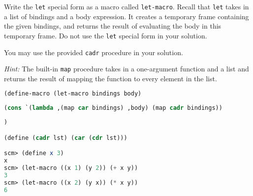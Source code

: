 \question Write the \texttt{let} special form as a macro called
\texttt{let-macro}.  Recall that \texttt{let} takes in a list of bindings and a
body expression. It creates a temporary frame containing the given bindings,
and returns the result of evaluating the body in this temporary frame. Do not
use the \texttt{let} special form in your solution.

You may use the provided \texttt{cadr} procedure in your solution.

\textit{Hint:} The built-in \texttt{map} procedure takes in a one-argument
function and a list and returns the result of mapping the function to every
element in the list.

\begin{lstlisting}[language=Scheme]
(define-macro (let-macro bindings body)
\end{lstlisting}

\begin{solution}[.5in]
\begin{lstlisting}[language=Scheme]
  (cons `(lambda ,(map car bindings) ,body) (map cadr bindings))
\end{lstlisting}
\end{solution}

\begin{lstlisting}[language=Scheme]
)

(define (cadr lst) (car (cdr lst)))

scm> (define x 3)
x
scm> (let-macro ((x 1) (y 2)) (+ x y))
3
scm> (let-macro ((x 2) (y x)) (* x y))
6
\end{lstlisting}
